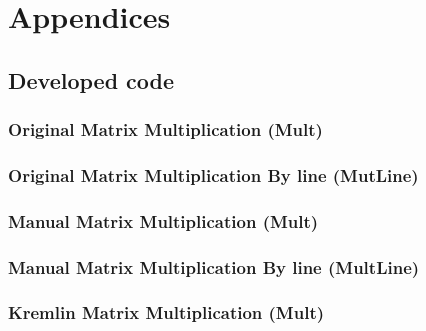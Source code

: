 \chapter{Appendices} \label{chap:chap7}

\section{Developed code}


\subsection{Original Matrix Multiplication (Mult)}

 

\subsection{Original Matrix Multiplication By line (MutLine)}



\subsection{Manual Matrix Multiplication (Mult)}



\subsection{Manual Matrix Multiplication By line (MultLine)}


	
\subsection{Kremlin Matrix Multiplication (Mult)}

